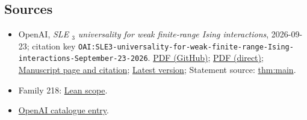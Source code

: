 \documentclass[11pt]{article}
\begin{document}
\subsection{Sources}
\begin{itemize}
\item OpenAI, \emph{SLE \({}_{3}\) universality for weak finite-range Ising interactions}, 2026-09-23; citation key \texttt{OAI:SLE3-universality-for-weak-finite-range-Ising-interactions-September-23-2026}. \href{https://github.com/openai/math/blob/adc7f1241b42e322a6451854ab7e4b4c146bf78a/preprints/SLE3-universality-for-weak-finite-range-Ising-interactions-September-23-2026/paper.pdf}{PDF (GitHub)}; \href{https://github.com/openai/math/raw/adc7f1241b42e322a6451854ab7e4b4c146bf78a/preprints/SLE3-universality-for-weak-finite-range-Ising-interactions-September-23-2026/paper.pdf}{PDF (direct)}; \href{https://github.com/openai/math/blob/adc7f1241b42e322a6451854ab7e4b4c146bf78a/preprints/SLE3-universality-for-weak-finite-range-Ising-interactions-September-23-2026/README.md}{Manuscript page and citation}; \href{https://github.com/openai/math/blob/main/preprints/SLE3-universality-for-weak-finite-range-Ising-interactions-September-23-2026/paper.pdf}{Latest version}; Statement source: \href{https://github.com/openai/math/blob/adc7f1241b42e322a6451854ab7e4b4c146bf78a/preprints/SLE3-universality-for-weak-finite-range-Ising-interactions-September-23-2026/build/sections/01-introduction.tex\#L117}{thm:main}.
\item Family 218: \href{https://github.com/openai/math/blob/adc7f1241b42e322a6451854ab7e4b4c146bf78a/lean/docs/218.md}{Lean scope}.
\item \href{https://github.com/openai/math/blob/adc7f1241b42e322a6451854ab7e4b4c146bf78a/CONTENTS.md}{OpenAI catalogue entry}.
\end{itemize}
\end{document}
